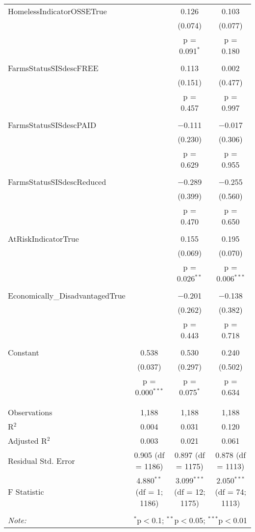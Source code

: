 \begin{table}[!htbp]
\begin{tabular}{@{\extracolsep{5pt}}lccc}
 HomelessIndicatorOSSETrue &  & 0.126 & 0.103 \\ 
  &  & (0.074) & (0.077) \\ 
  &  & p = 0.091$^{*}$ & p = 0.180 \\ 
  & & & \\ 
 FarmsStatusSISdescFREE &  & 0.113 & 0.002 \\ 
  &  & (0.151) & (0.477) \\ 
  &  & p = 0.457 & p = 0.997 \\ 
  & & & \\ 
 FarmsStatusSISdescPAID &  & $-$0.111 & $-$0.017 \\ 
  &  & (0.230) & (0.306) \\ 
  &  & p = 0.629 & p = 0.955 \\ 
  & & & \\ 
 FarmsStatusSISdescReduced &  & $-$0.289 & $-$0.255 \\ 
  &  & (0.399) & (0.560) \\ 
  &  & p = 0.470 & p = 0.650 \\ 
  & & & \\ 
 AtRiskIndicatorTrue &  & 0.155 & 0.195 \\ 
  &  & (0.069) & (0.070) \\ 
  &  & p = 0.026$^{**}$ & p = 0.006$^{***}$ \\ 
  & & & \\ 
 Economically\_DisadvantagedTrue &  & $-$0.201 & $-$0.138 \\ 
  &  & (0.262) & (0.382) \\ 
  &  & p = 0.443 & p = 0.718 \\ 
  & & & \\ 
 Constant & 0.538 & 0.530 & 0.240 \\ 
  & (0.037) & (0.297) & (0.502) \\ 
  & p = 0.000$^{***}$ & p = 0.075$^{*}$ & p = 0.634 \\ 
  & & & \\ 
\hline \\[-1.8ex] 
Observations & 1,188 & 1,188 & 1,188 \\ 
R$^{2}$ & 0.004 & 0.031 & 0.120 \\ 
Adjusted R$^{2}$ & 0.003 & 0.021 & 0.061 \\ 
Residual Std. Error & 0.905 (df = 1186) & 0.897 (df = 1175) & 0.878 (df = 1113) \\ 
F Statistic & 4.880$^{**}$ (df = 1; 1186) & 3.099$^{***}$ (df = 12; 1175) & 2.050$^{***}$ (df = 74; 1113) \\ 
\hline 
\hline \\[-1.8ex] 
\textit{Note:}  & \multicolumn{3}{r}{$^{*}$p$<$0.1; $^{**}$p$<$0.05; $^{***}$p$<$0.01} \\ 
\end{tabular} 
\end{table} 
